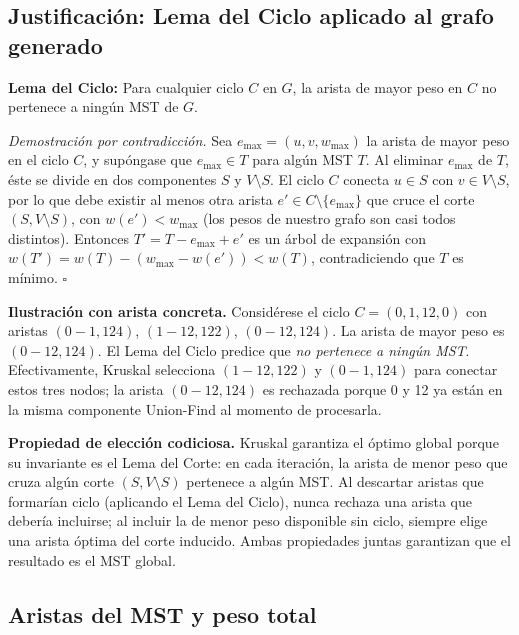 \documentclass[11pt, a4paper]{article}
\begin{document}
\subsection{Justificación: Lema del Ciclo aplicado al grafo generado}

\textbf{Lema del Ciclo:} Para cualquier ciclo $C$ en $G$, la arista de mayor peso en
$C$ no pertenece a ningún MST de $G$.

\textit{Demostración por contradicción.} Sea $e_{\max}=(u,v,w_{\max})$ la arista de
mayor peso en el ciclo $C$, y supóngase que $e_{\max}\in T$ para algún MST $T$.
Al eliminar $e_{\max}$ de $T$, éste se divide en dos componentes $S$ y $V\setminus S$.
El ciclo $C$ conecta $u\in S$ con $v\in V\setminus S$, por lo que debe existir al
menos otra arista $e'\in C\setminus\{e_{\max}\}$ que cruce el corte $(S,V\setminus S)$,
con $w(e')< w_{\max}$ (los pesos de nuestro grafo son casi todos distintos).
Entonces $T'=T-e_{\max}+e'$ es un árbol de expansión con
$w(T')=w(T)-(w_{\max}-w(e'))<w(T)$, contradiciendo que $T$ es mínimo. $\square$

\textbf{Ilustración con arista concreta.} Considérese el ciclo $C=(0,1,12,0)$
con aristas $(0{-}1,124)$, $(1{-}12,122)$, $(0{-}12,124)$. La arista de mayor peso
es $(0{-}12,124)$. El Lema del Ciclo predice que \emph{no pertenece a ningún MST}.
Efectivamente, Kruskal selecciona $(1{-}12,122)$ y $(0{-}1,124)$ para conectar estos
tres nodos; la arista $(0{-}12,124)$ es rechazada porque 0 y 12 ya están en la misma
componente Union-Find al momento de procesarla.

\textbf{Propiedad de elección codiciosa.} Kruskal garantiza el óptimo global
porque su invariante es el Lema del Corte: en cada iteración, la arista de menor
peso que cruza algún corte $(S, V\setminus S)$ pertenece a algún MST. Al descartar
aristas que formarían ciclo (aplicando el Lema del Ciclo), nunca rechaza una arista
que debería incluirse; al incluir la de menor peso disponible sin ciclo, siempre elige
una arista óptima del corte inducido. Ambas propiedades juntas garantizan que el
resultado es el MST global.

\subsection{Aristas del MST y peso total}
\end{document}
